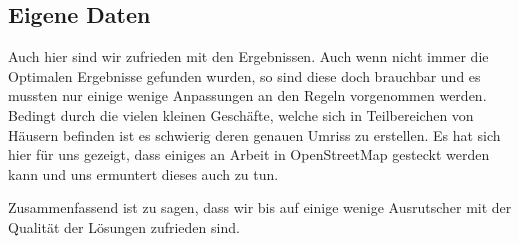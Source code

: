 \subsection{Eigene Daten}
Auch hier sind wir zufrieden mit den Ergebnissen. Auch wenn nicht immer die Optimalen Ergebnisse
gefunden wurden, so sind diese doch brauchbar und es mussten nur einige wenige Anpassungen
an den Regeln vorgenommen werden.
Bedingt durch die vielen kleinen Geschäfte, welche sich in Teilbereichen von Häusern befinden ist es schwierig
deren genauen Umriss zu erstellen.
Es hat sich hier für uns gezeigt, dass einiges an Arbeit in OpenStreetMap gesteckt werden kann und
uns ermuntert dieses auch zu tun.


Zusammenfassend ist zu sagen, dass wir bis auf einige wenige Ausrutscher mit der
Qualität der Lösungen zufrieden sind.
